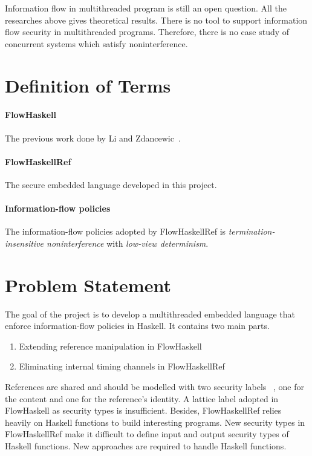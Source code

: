 \documentclass[a4paper]{report}
\begin{document}
Information flow in multithreaded program is still an open question.
All the researches above gives theoretical results.
There is no tool to support information flow security in multithreaded
programs. Therefore, there is no case study of concurrent systems which 
satisfy noninterference.


\section{Definition of Terms}
\paragraph{FlowHaskell}
The previous work done by Li and Zdancewic~\cite{Li:Zdancewic:CSFW}.

\paragraph{FlowHaskellRef}
The secure embedded language developed in this project. 

\paragraph{Information-flow policies}
The information-flow policies adopted by FlowHaskellRef is {\em termination-insensitive
noninterference} with {\em low-view determinism}.

\section{Problem Statement}
The goal of the project is to develop a multithreaded embedded language that enforce information-flow policies
in Haskell. It contains two main parts. 
\begin{enumerate}
\item Extending reference manipulation in FlowHaskell
\item Eliminating internal timing channels in FlowHaskellRef
\end{enumerate}

References are shared and should be modelled with two security labels~\cite{Pottier:Simonet:POPL02}
, one for the content and one for the 
reference's identity. A lattice label adopted in FlowHaskell as security types is insufficient. 
Besides, FlowHaskellRef relies heavily on Haskell functions to build interesting programs. New security types in
FlowHaskellRef make it difficult to define input and output security types of Haskell functions.
New approaches are required to handle Haskell functions.
\end{document}
